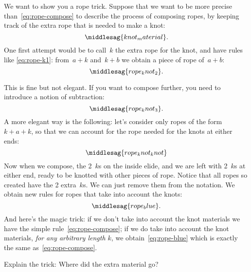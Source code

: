 We want to show you a rope trick.
Suppose that we want to be more precise than~\cref{eq:rope-compose} to describe the process of composing ropes, by keeping track of the extra rope that is needed to make a knot:
%
\begin{equation}
    \label{eq:knot_material}
    \middlesag{knot_material}.
\end{equation}
%
One first attempt would be to call~$k$ the extra rope for the knot, and have rules like \cref{eq:rope-k1}: from~$a + k$ and~$k + b$ we obtain a piece of rope of~$a+b$:
%
\begin{equation}
    \label{eq:rope-k1}
    \middlesag{rope_knot_2}.
\end{equation}

%
%
This is fine but not elegant.
If you want to compose further, you need to introduce a notion of subtraction:
%
\begin{equation}
    \label{eq:rope-k2}
    \middlesag{rope_knot_3}.
\end{equation}
%
A more elegant way is the following: let's consider only ropes of the form~$k + a + k$, so that we can account for the rope needed for the knots at either ends:
%
\begin{equation}
    \label{eq:rope-kk}
    \middlesag{rope_knot_knot}
\end{equation}
%
Now when we compose, the 2~$k$s on the inside elide, and we are left with 2~$k$s at either end, ready to be knotted with other pieces of rope.
Notice that all ropes so created have the 2 extra~$k$s.
We can just remove them from the notation.
We obtain new rules for ropes that take into account the knots:
%
\begin{equation}
    \label{eq:rope-blue}
    \middlesag{rope_blue}.
\end{equation}
%
And here's the magic trick: if we don't take into account the knot materials we have the simple rule~\cref{eq:rope-compose}; if we do take into account the knot materials, \emph{for any arbitrary length $k$}, we obtain~\cref{eq:rope-blue} which is exactly the same as~\cref{eq:rope-compose}.
\begin{exercise}
    Explain the trick: Where did the extra material go?
\end{exercise}
